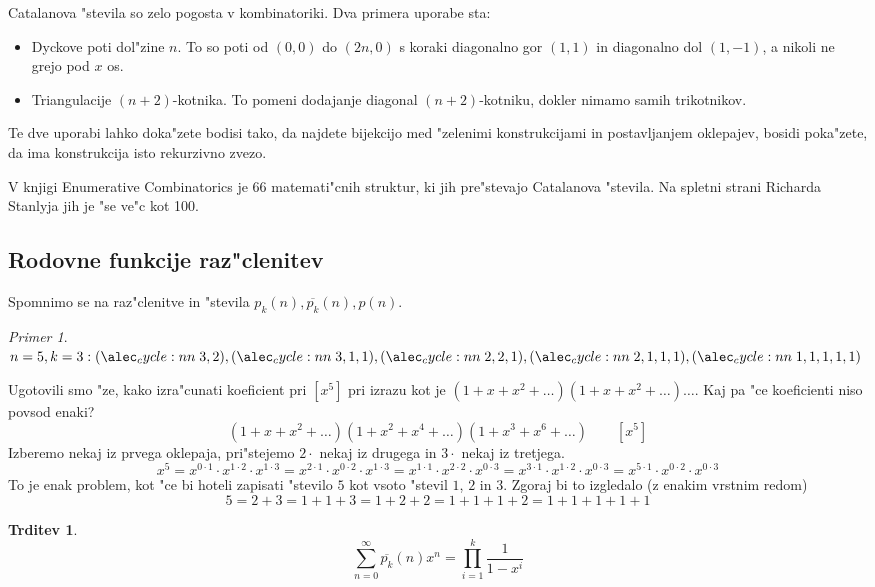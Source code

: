 \documentclass[a4paper,12pt]{article}
\theoremstyle{definition}
\newtheorem{claim}[counter]{Trditev}
\theoremstyle{remark}
\newtheorem*{ex}{Primer}
\begin{document}
Catalanova "stevila so zelo pogosta v kombinatoriki. Dva primera uporabe sta:
\begin{itemize}
	\item Dyckove poti dol"zine $n$. To so poti od $(0,0)$ do $(2n, 0)$ s koraki diagonalno gor $(1,1)$ in diagonalno dol $(1, -1)$, a nikoli ne grejo pod $x$ os.
	\item Triangulacije $(n + 2)$-kotnika. To pomeni dodajanje diagonal $(n+2)$-kotniku, dokler nimamo samih trikotnikov.
\end{itemize}
\label{TODO: add image 9}
Te dve uporabi lahko doka"zete bodisi tako, da najdete bijekcijo med "zelenimi konstrukcijami in postavljanjem oklepajev, bosidi poka"zete, da ima konstrukcija isto rekurzivno zvezo.

V knjigi Enumerative Combinatorics je 66 matemati"cnih struktur, ki jih pre"stevajo Catalanova "stevila. Na spletni strani Richarda Stanlyja jih je "se ve"c kot 100.

\subsection{Rodovne funkcije raz"clenitev}
Spomnimo se na raz"clenitve in "stevila $p_k(n), \overline{p_k}(n), p(n)$.
\begin{ex}
	$n = 5, k = 3: \cycle{3, 2}, \cycle{3, 1, 1}, \cycle{2, 2, 1}, \cycle{2, 1, 1, 1}, \cycle{1, 1, 1, 1, 1}$
\end{ex}

Ugotovili smo "ze, kako izra"cunati koeficient pri $[x^5]$ pri izrazu kot je $(1 + x + x^2 + \ldots)(1 + x + x^2 + \ldots)\ldots$. Kaj pa "ce koeficienti niso povsod enaki?
\[(1 + x + x^2 + \ldots)(1 + x^2 + x^4 + \ldots)(1 + x^3 + x^6 + \ldots) \qquad[x^5]\]
Izberemo nekaj iz prvega oklepaja, pri"stejemo $2\cdot$ nekaj iz drugega in $3 \cdot$ nekaj iz tretjega.
\[x^5 = 
x^{0 \cdot 1} \cdot x^{1 \cdot 2} \cdot x^{1 \cdot 3} = 
x^{2 \cdot 1} \cdot x^{0 \cdot 2} \cdot x^{1 \cdot 3} = 
x^{1 \cdot 1} \cdot x^{2 \cdot 2} \cdot x^{0 \cdot 3} =
x^{3 \cdot 1} \cdot x^{1 \cdot 2} \cdot x^{0 \cdot 3} = 
x^{5 \cdot 1} \cdot x^{0 \cdot 2} \cdot x^{0 \cdot 3}\]
To je enak problem, kot "ce bi hoteli zapisati "stevilo $5$ kot vsoto "stevil $1$, $2$ in $3$. Zgoraj bi to izgledalo (z enakim vrstnim redom)
\[5 = 2 + 3 = 1 + 1 + 3 = 1 + 2 + 2 = 1 + 1 + 1 + 2 = 1 + 1 + 1 + 1 + 1\]

\begin{claim}
	\[\sum_{n = 0}^{\infty} \overline{p_k} (n) x^n = \prod_{i = 1}^k \frac{1}{1 - x^i}\]
\end{claim}
\end{document}
